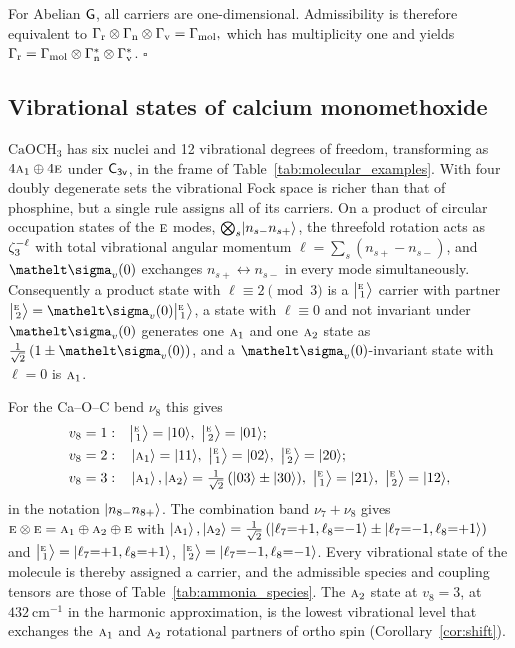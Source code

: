For Abelian \(\mathsf{G}\), all carriers are one-dimensional. Admissibility is therefore equivalent to \(
\Gamma_{\mathrm{r}}\otimes\Gamma_{\mathrm{n}}\otimes\Gamma_{\mathrm{v}}
=\Gamma_{\mathrm{mol}},
\)
which has multiplicity one and yields \(\Gamma_{\mathrm{r}}
=\Gamma_{\mathrm{mol}}\otimes\Gamma_{\mathrm{n}}^*
\otimes\Gamma_{\mathrm{v}}^*\).
\hfill$\square$


\subsection{Vibrational states of calcium monomethoxide}
\label{app:caoch3}

$\mathrm{CaOCH_3}$ has six nuclei and 12 vibrational degrees of freedom, transforming as $4\text{\normalfont\scshape a}_{1}\oplus4\text{\normalfont\scshape e}$ under $\mathsf{C_{3v}}$, in the frame of Table~\ref{tab:molecular_examples}. With four doubly degenerate sets the vibrational Fock space is richer than that of phosphine, but a single rule assigns all of its carriers. On a product of circular occupation states of the $\text{\normalfont\scshape e}$ modes, $\bigotimes_s\lvert n_{s-}n_{s+}\rangle$, the threefold rotation acts as $\zeta_{3}^{-\ell}$ with total vibrational angular momentum $\ell=\sum_s(n_{s+}-n_{s-})$, and $\elt{\sigma_{v}}(0)$ exchanges $n_{s+}\leftrightarrow n_{s-}$ in every mode simultaneously. Consequently a product state with $\ell\equiv2\pmod 3$ is a $\bigl\lvert{}^{\text{\normalfont\scshape e}}_{\,1}\bigr\rangle$ carrier with partner $\irket{\irr{e}}{2}=\elt{\sigma_{v}}(0)\irket{\irr{e}}{1}$, a state with $\ell\equiv0$ and not invariant under $\elt{\sigma_{v}}(0)$ generates one $\text{\normalfont\scshape a}_{1}$ and one $\text{\normalfont\scshape a}_{2}$ state as $\tfrac{1}{\sqrt{2}}\,(1\pm\elt{\sigma_{v}}(0))$, and a $\elt{\sigma_{v}}(0)$-invariant state with $\ell=0$ is $\text{\normalfont\scshape a}_{1}$.

For the Ca--O--C bend $\nu_8$ this gives
\begin{align}
v_8=1:&\quad \irket{\irr{e}}{1}=\occ{10},\ \irket{\irr{e}}{2}=\occ{01};\nonumber\\
v_8=2:&\quad \ket{\irr{a}_{1}}=\occ{11},\ \irket{\irr{e}}{1}=\occ{02},\ \irket{\irr{e}}{2}=\occ{20};\nonumber\\
v_8=3:&\quad \ket{\irr{a}_{1}},\ket{\irr{a}_{2}}=\tfrac{1}{\sqrt{2}}\,(\occ{03}\pm\occ{30}),\ \irket{\irr{e}}{1}=\occ{21},\ \irket{\irr{e}}{2}=\occ{12},
\label{eq:caoch3_bend}
\end{align}
in the notation $\lvert n_{8-}n_{8+}\rangle$. The combination band $\nu_7+\nu_8$ gives $\text{\normalfont\scshape e}\otimes\text{\normalfont\scshape e}=\text{\normalfont\scshape a}_{1}\oplus\text{\normalfont\scshape a}_{2}\oplus\text{\normalfont\scshape e}$ with $\ket{\text{\normalfont\scshape a}_{1}},\ket{\text{\normalfont\scshape a}_{2}}=\tfrac{1}{\sqrt{2}}\,(\ket{\ell_7{=}{+1},\ell_8{=}{-1}}\pm\ket{\ell_7{=}{-1},\ell_8{=}{+1}})$ and $\bigl\lvert{}^{\text{\normalfont\scshape e}}_{\,1}\bigr\rangle=\ket{\ell_7{=}{+1},\ell_8{=}{+1}}$, $\bigl\lvert{}^{\text{\normalfont\scshape e}}_{\,2}\bigr\rangle=\ket{\ell_7{=}{-1},\ell_8{=}{-1}}$. Every vibrational state of the molecule is thereby assigned a carrier, and the admissible species and coupling tensors are those of Table~\ref{tab:ammonia_species}. The $\text{\normalfont\scshape a}_{2}$ state at $v_8=3$, at $432\ \mathrm{cm^{-1}}$ in the harmonic approximation, is the lowest vibrational level that exchanges the $\text{\normalfont\scshape a}_{1}$ and $\text{\normalfont\scshape a}_{2}$ rotational partners of ortho spin (Corollary~\ref{cor:shift}).



